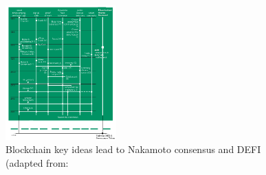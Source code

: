 \documentclass[final,5p,times,twocolumn,authoryear]{elsarticle}
\begin{document}



\begin{figure}
    \centering
    \label{fig:narayanan}
    \includegraphics[width=0.38\textwidth]{narayanan3.png}
    \vspace*{-0.3cm}
    \caption{Blockchain key ideas lead to Nakamoto consensus and DEFI\\ (adapted from: \href{https://queue.acm.org/detail.cfm?id=3136559}{}}
\end{figure}
    

\end{document}
